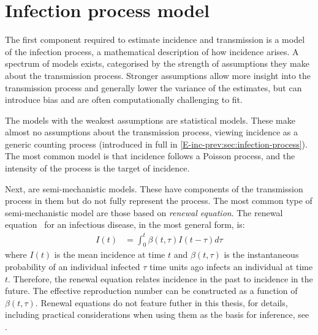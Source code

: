 \documentclass[thesis.tex]{subfiles}
\begin{document}
\section{Infection process model}

The first component required to estimate incidence and transmission is a model of the infection process, a mathematical description of how incidence arises.
A spectrum of models exists, categorised by the strength of assumptions they make about the transmission process.
Stronger assumptions allow more insight into the transmission process and generally lower the variance of the estimates, but can introduce bias and are often computationally challenging to fit.

The models with the weakest assumptions are statistical models.
These make almost no assumptions about the transmission process, viewing incidence as a generic counting process (introduced in full in \cref{E-inc-prev:sec:infection-process}).
The most common model is that incidence follows a Poisson process, and the intensity of the process is the target of incidence.

Next, are semi-mechanistic models.
These have components of the transmission process in them but do not fully represent the process.
The most common type of semi-mechanistic model are those based on \emph{renewal equation}.
The renewal equation~\autocite{fraserRenewal} for an infectious disease, in the most general form, is:
\begin{align}
    I(t) &= \int_{0}^{t} \beta(t,\tau) I(t-\tau) d \tau
\end{align}
where $I(t)$ is the mean incidence at time $t$ and $\beta(t, \tau)$ is the instantaneous probability of an individual infected $\tau$ time units ago infects an individual at time $t$.
Therefore, the renewal equation relates incidence in the past to incidence in the future.
The effective reproduction number can be constructed as a function of $\beta(t, \tau)$.
Renewal equations do not feature futher in this thesis, for details, including practical considerations when using them as the basis for inference, see \textcite{nashEstimating,gosticPractical}.
\end{document}
